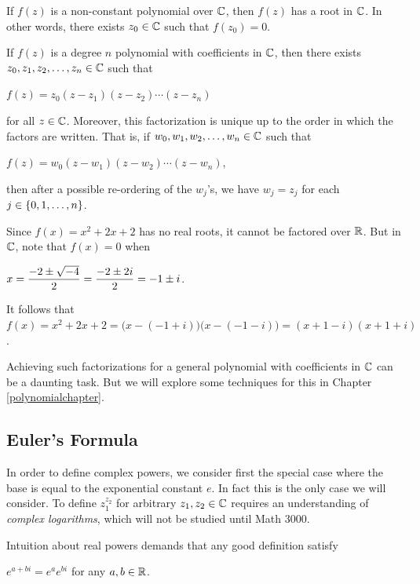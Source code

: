 \documentclass[11pt,fleqn,dvipsnames,usenames]{article}
\newcommand{\p}{\noindent}
\begin{document}
\begin{theorem}\label{ftoalgebra}
If $f(z)$ is a non-constant polynomial over $\mathbb{C}$, then $f(z)$ has a root in $\mathbb{C}$.  In other words, there exists $z_{0}\in\mathbb{C}$ such that $f(z_{0}) = 0$.
\end{theorem}
%
\begin{corollary}\label{ftoalgebracorollary}
If $f(z)$ is a degree $n$ polynomial with coefficients in $\mathbb{C}$, then there exists $z_{0},z_{1},z_{2},\ldots,z_{n}\in\nolinebreak\C$ such that
\begin{center}
$f(z) = z_{0}(z - z_{1})(z - z_{2})\cdots (z - z_{n})$
\end{center}
for all $z\in \mathbb{C}$.  Moreover, this factorization is unique up to the order in which the factors are written.  That is, if $w_{0},w_{1},w_{2},\ldots, w_{n}\in\mathbb{C}$ such that
\begin{center}
$f(z) = w_{0}(z - w_{1})(z - w_{2})\cdots (z - w_{n})$,
\end{center}
then after a possible re-ordering of the $w_{j}$'s, we have $w_{j} = z_{j}$ for each $j\in\left\{0,1,\ldots, n\right\}$.
\end{corollary}
%
\begin{example}
Since $f(x) = x^2 + 2x + 2$ has no real roots, it cannot be factored over $\mathbb{R}$.  But in $\mathbb{C}$, note that $f(x) = 0$ when
\begin{center}
$\displaystyle{x = \frac{-2 \pm \sqrt{-4}}{2} = \frac{-2 \pm 2i}{2} = -1\pm i}$.
\end{center}
It follows that $f(x) = x^2 + 2x + 2 = \big(x - (-1 + i)\big)\big(x - (-1 - i)\big) = (x + 1 - i)(x +1 +i)$.
\end{example}
%
\p Achieving such factorizations for a general polynomial with coefficients in $\mathbb{C}$ can be a daunting task.  But we will explore some techniques for this in Chapter \ref{polynomialchapter}.

\subsection{Euler's Formula}

\begin{remark}\label{complexpowerexpectation}
In order to define complex powers, we consider first the special case where the base is equal to the exponential constant $e$.  In fact this is the only case we will consider.  To define $z_{1}^{z_{2}}$ for arbitrary $z_{1},z_{2}\in\mathbb{C}$ requires an understanding of \emph{complex logarithms}, which will not be studied until Math 3000.
\vsp

\p Intuition about real powers demands that any good definition satisfy
\begin{center}
$e^{a+bi} = e^{a}e^{bi}$ for any $a,b\in\mathbb{R}$.
\end{center}
\end{remark}
\end{document}
